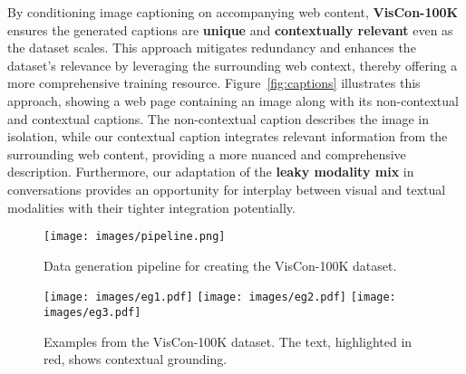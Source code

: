 

By conditioning image captioning on accompanying web content, \textbf{VisCon-100K} ensures the generated captions are \textbf{unique} and \textbf{contextually relevant} even as the dataset scales. This approach mitigates redundancy and enhances the dataset's relevance by leveraging the surrounding web context, thereby offering a more comprehensive training resource.
Figure~\ref{fig:captions} illustrates this approach, showing a web page containing an image along with its non-contextual and contextual captions. The non-contextual caption describes the image in isolation, while our contextual caption integrates relevant information from the surrounding web content, providing a more nuanced and comprehensive description. Furthermore, our adaptation of the \textbf{leaky modality mix} in conversations provides an opportunity for interplay between visual and textual modalities with their tighter integration potentially.

\begin{figure*}[t]
  \centering
  \texttt{[image: images/pipeline.png]}
  \caption{Data generation pipeline for creating the VisCon-100K dataset.}
  \label{fig:pipeline}
\end{figure*}


\begin{figure*}[]
  \centering
  \texttt{[image: images/eg1.pdf]}
  \texttt{[image: images/eg2.pdf]}
  \texttt{[image: images/eg3.pdf]}
  \caption{Examples from the VisCon-100K dataset. The text, highlighted in red, shows contextual grounding.}
  \label{fig:examples}
\end{figure*}